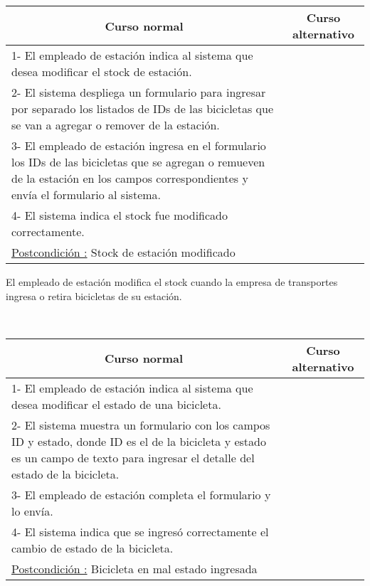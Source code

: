 \begin{center}
    \centering
    \begin{tabular}{ | p{11cm} | p{6cm} | }
    	\multicolumn{1}{c}{\cellcolor{black!30}\textbf{Curso normal}} & 
    	\multicolumn{1}{c}{\cellcolor{black!30}\textbf{Curso alternativo}} \\
		\hline
		1- El empleado de estación indica al sistema que desea modificar el stock de estación. & \\ \hline
		2- El sistema despliega un formulario para ingresar por separado los listados de IDs de las bicicletas que se van a agregar o remover de la estación. & \\ \hline
		3- El empleado de estación ingresa en el formulario los IDs de las bicicletas que se agregan o remueven de la estación en los campos correspondientes y envía el formulario al sistema. & \\ \hline
		4- El sistema indica el stock fue modificado correctamente. & \\ \hline
		\underline{Postcondición :} Stock de estación modificado & \\ \hline
    \end{tabular}
\end{center}	

El empleado de estación modifica el stock cuando la empresa de transportes ingresa o retira bicicletas de su estación.

~

\begin{center}
    \centering
    \begin{tabular}{ | p{11cm} | p{6cm} | }
    	\multicolumn{1}{c}{\cellcolor{black!30}\textbf{Curso normal}} & 
    	\multicolumn{1}{c}{\cellcolor{black!30}\textbf{Curso alternativo}} \\
		\hline
		1- El empleado de estación indica al sistema que desea modificar el estado de una bicicleta. & \\ \hline
		2- El sistema muestra un formulario con los campos ID y estado, donde ID es el de la bicicleta y estado es un campo de texto para ingresar el detalle del estado de la bicicleta. & \\ \hline
		3- El empleado de estación completa el formulario y lo envía. & \\ \hline
		4- El sistema indica que se ingresó correctamente el cambio de estado de la bicicleta. & \\ \hline
		\underline{Postcondición :} Bicicleta en mal estado ingresada & \\ \hline
    \end{tabular}
\end{center}

